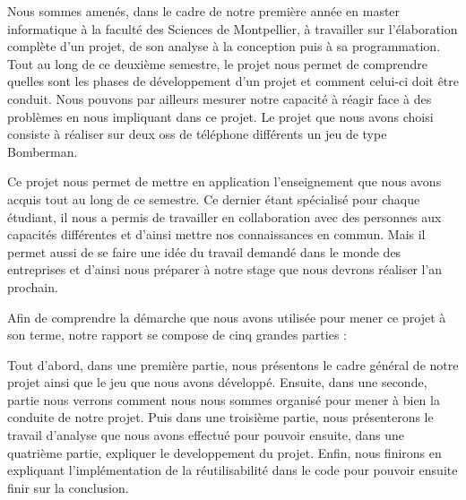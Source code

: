 Nous sommes amenés, dans le cadre de notre première année en master informatique à la faculté des Sciences de Montpellier, à travailler sur l’élaboration complète d’un projet, de son analyse à la conception puis à sa programmation. Tout au long de ce deuxième semestre, le projet nous permet de comprendre quelles sont les phases de développement d’un projet et comment celui-ci doit être conduit. Nous pouvons par ailleurs mesurer notre capacité à réagir face à des problèmes en nous impliquant dans ce projet. Le projet que nous avons choisi consiste à réaliser sur deux \glspl{os} de téléphone différents un jeu de type Bomberman.

Ce projet nous permet de mettre en application l'enseignement que nous avons acquis tout au long de ce semestre. Ce dernier étant spécialisé pour chaque étudiant, il nous a permis de travailler en collaboration avec des personnes aux capacités différentes et d'ainsi mettre nos connaissances en commun. Mais il permet aussi de se faire une idée du travail demandé dans le monde des entreprises et d'ainsi nous préparer à notre stage que nous devrons réaliser l'an prochain.

Afin de comprendre la démarche que nous avons utilisée pour mener ce projet à son terme, notre rapport se compose de cinq grandes parties : 

Tout d'abord, dans une première partie, nous présentons le cadre général de notre projet ainsi que le jeu que nous avons développé. Ensuite, dans une seconde, partie nous verrons comment nous nous sommes organisé pour mener à bien la conduite de notre projet. Puis dans une troisième partie, nous présenterons le travail d'analyse que nous avons effectué pour pouvoir ensuite, dans une quatrième partie, expliquer le developpement du projet. Enfin, nous finirons en expliquant l'implémentation de la réutilisabilité dans le code pour pouvoir ensuite finir sur la conclusion.
